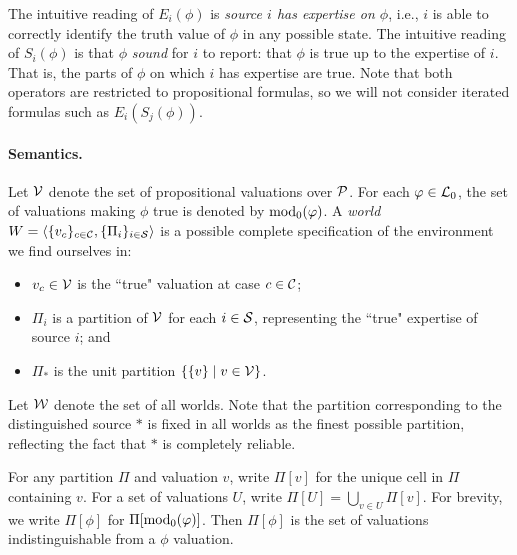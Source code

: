 The intuitive reading of $E_i(\phi)$ is {\em source $i$ has expertise on
$\phi$}, i.e., $i$ is able to correctly identify the truth value of $\phi$ in
any possible state. The intuitive reading of $S_i(\phi)$ is that $\phi$
\emph{sound} for $i$ to report: that $\phi$ is true up to the
expertise of $i$. That is, the parts of $\phi$ on which $i$ has expertise are
true. Note that both operators are restricted to propositional
formulas, so we will not consider iterated formulas such as $E_i(S_j(\phi))$.

\paragraph{Semantics.}

Let $\vals$ denote the set of propositional valuations over $\propvars$. For
each $\phi \in \lprop$, the set of valuations making $\phi$ true is denoted by
$\propmods(\phi)$. A \emph{world} $W = \tuple{\{v_c\}_{c \in \C}, \{\Pi_i\}_{i
\in \S}}$ is a possible complete specification of the environment we find
ourselves in:
\begin{itemize}
    \item $v_c \in \vals$ is the ``true" valuation at case $c \in \C$;
    \item $\Pi_i$ is a partition of $\vals$ for each $i \in \S$, representing
          the ``true" expertise of source $i$; and
    \item $\Pi_\ast$ is the unit partition $\{\{v\} \mid v \in \vals\}$.
\end{itemize}
Let $\W$ denote the set of all worlds.  Note that the partition corresponding
to the distinguished source $\ast$ is fixed in all worlds as the finest
possible partition, reflecting the fact that $\ast$ is completely reliable.

For any partition $\Pi$ and valuation $v$, write $\Pi[v]$ for the unique cell
in $\Pi$ containing $v$. For a set of valuations $U$, write $\Pi[U] =
\bigcup_{v \in U}{\Pi[v]}$. For brevity, we write $\Pi[\phi]$ for
$\Pi[\propmods(\phi)]$. Then $\Pi[\phi]$ is the set of valuations
indistinguishable from a $\phi$ valuation.

